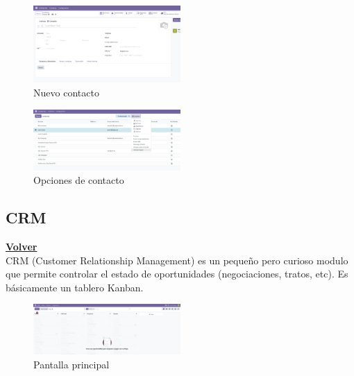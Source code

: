 \documentclass[a4paper,12pt]{article}
\begin{document}
\begin{figure}[h!]
    \centering
    \includegraphics[width=0.5\textwidth]{pr2odoo64-nuevoContacto.png}
    \caption{Nuevo contacto}
\end{figure}
\FloatBarrier


\begin{figure}[h!]
    \centering
    \includegraphics[width=0.5\textwidth]{pr2odoo65-opcionesContacto.png}
    \caption{Opciones de contacto}
\end{figure}
\FloatBarrier

\subsection{CRM}
\hyperlink{anchor-indice}{\textbf{Volver}}\\

CRM (Customer Relationship Management) es un pequeño pero curioso modulo que permite controlar el estado de oportunidades (negociaciones, tratos, etc). Es básicamente un tablero Kanban.

\begin{figure}[h!]
    \centering
    \includegraphics[width=0.5\textwidth]{pr2odoo66-pantallaPrincipal.png}
    \caption{Pantalla principal}
\end{figure}
\FloatBarrier
\end{document}
